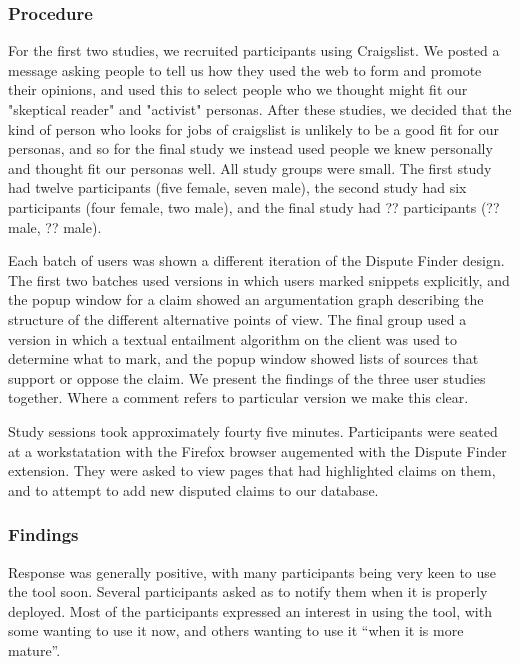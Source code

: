 \documentclass{www2010-submission}
\newcommand{\todo}[1]{}
\begin{document}
\subsubsection{Procedure}

For the first two studies, we recruited participants using Craigslist. We posted a message asking people to tell us how they used the web to form and promote their opinions, and used this to select people who we thought might fit our "skeptical reader" and "activist" personas. After these studies, we decided that the kind of person who looks for jobs of craigslist is unlikely to be a good fit for our personas, and so for the final study we instead used people we knew personally and thought fit our personas well. All study groups were small. The first study had twelve participants (five female, seven male), the second study had six participants (four female, two male), and the final study had ?? participants (?? male, ?? male). 

Each batch of users was shown a different iteration of the Dispute Finder design. The first two batches used versions in which users marked snippets explicitly, and the popup window for a claim showed an argumentation graph describing the structure of the different alternative points of view. The final group used a version in which a textual entailment algorithm on the client was used to determine what to mark, and the popup window showed lists of sources that support or oppose the claim. We present the findings of the three user studies together. Where a comment refers to particular version we make this clear.

Study sessions took approximately fourty five minutes. Participants were seated at a workstatation with the Firefox browser augemented with the Dispute Finder extension. They were asked to view pages that had highlighted claims on them, and to attempt to add new disputed claims to our database.

\todo{Need to finish the third wave of user studies}

\subsubsection{Findings}

Response was generally positive, with many participants being very keen to use the tool soon. Several participants asked as to notify them when it is properly deployed. Most of the participants expressed an interest in using the tool, with some wanting to use it now, and others wanting to use it ``when it is more mature''.
\end{document}
